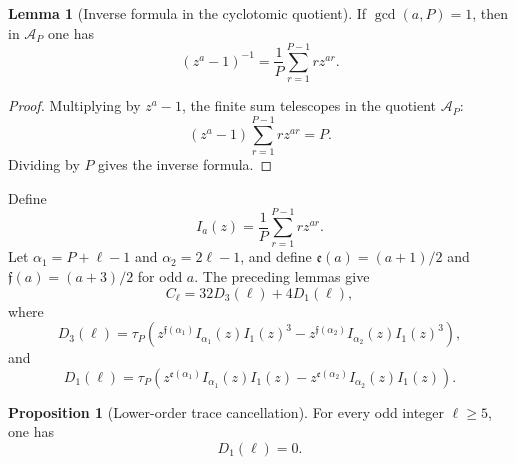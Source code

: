 \documentclass{article}
\theoremstyle{definition}
\newtheorem{lemma}[theorem]{Lemma}
\newtheorem{proposition}[theorem]{Proposition}
\numberwithin{equation}{section}
\begin{document}
\begin{lemma}[Inverse formula in the cyclotomic quotient]
\label{lem:inverse-formula-cyclotomic}
If $\gcd(a,P)=1$, then in $\mathcal A_P$ one has
\begin{equation}
(z^a-1)^{-1}=\frac1P\sum_{r=1}^{P-1}r z^{ar}.
\end{equation}
\end{lemma}

\begin{proof}
Multiplying by $z^a-1$, the finite sum telescopes in the quotient $\mathcal A_P$:
\begin{equation}
(z^a-1)\sum_{r=1}^{P-1}r z^{ar}=P.
\end{equation}
Dividing by $P$ gives the inverse formula.
\end{proof}

Define
\begin{equation}
I_a(z)=\frac1P\sum_{r=1}^{P-1}r z^{ar}.
\end{equation}
Let $\alpha_1=P+\ell-1$ and $\alpha_2=2\ell-1$, and define $\mathfrak e(a)=(a+1)/2$ and $\mathfrak f(a)=(a+3)/2$ for odd $a$.
The preceding lemmas give
\begin{equation}
C_\ell=32D_3(\ell)+4D_1(\ell),
\end{equation}
where
\begin{equation}
D_3(\ell)=\tau_P\left(z^{\mathfrak f(\alpha_1)}I_{\alpha_1}(z)I_1(z)^3-z^{\mathfrak f(\alpha_2)}I_{\alpha_2}(z)I_1(z)^3\right),
\end{equation}
and
\begin{equation}
D_1(\ell)=\tau_P\left(z^{\mathfrak e(\alpha_1)}I_{\alpha_1}(z)I_1(z)-z^{\mathfrak e(\alpha_2)}I_{\alpha_2}(z)I_1(z)\right).
\end{equation}

\begin{proposition}[Lower-order trace cancellation]
\label{prop:D1-cancellation}
For every odd integer $\ell\geq 5$, one has
\begin{equation}
D_1(\ell)=0.
\end{equation}
\end{proposition}
\end{document}
